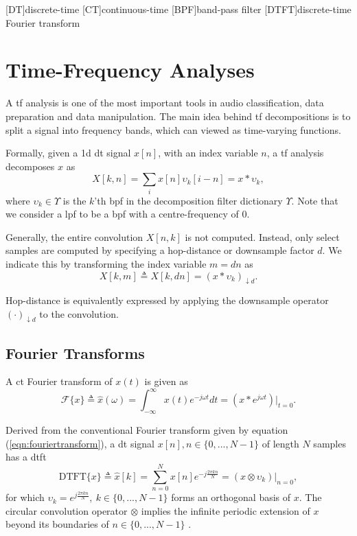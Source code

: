 [DT]{discrete-time}
[CT]{continuous-time}
[BPF]{band-pass filter}
[DTFT]{discrete-time Fourier transform}

\chapter{Time-Frequency Analyses}
\label{chap:p1i}

A \ac{tf} analysis is one of the most important tools in audio classification, data preparation and data manipulation. The main idea behind \ac{tf} decompositions is to split a signal into frequency bands, which can viewed as time-varying functions.

Formally, given a \ac{1d} \ac{dt} signal $x[n]$, with an index variable $n$, a \ac{tf} analysis decomposes $x$ as 
\begin{equation}
    X[k, n] = \sum_i x[n] \upsilon_k[i - n] = x * \upsilon_k,
\end{equation}
where $\upsilon_k \in \Upsilon$ is the $k$'th \ac{bpf} in the decomposition filter dictionary $\Upsilon$. Note that we consider a \ac{lpf} to be a \ac{bpf} with a centre-frequency of 0.

Generally, the entire convolution $X[n,k]$ is not computed. Instead, only select samples are computed by specifying a hop-distance or downsample factor $d$. We indicate this by transforming the index variable $m = dn$ as 
\begin{equation}
    \label{eqn:gentf}
    X[k, m] \triangleq X[k, dn] = \left(x * \upsilon_k\right)_{\downarrow d}.
\end{equation}

Hop-distance is equivalently expressed by applying the downsample operator $\left(\cdot\right)_{\downarrow d}$ to the convolution. 

\section{Fourier Transforms}

A \ac{ct} Fourier transform of $x(t)$ is given as 
\begin{equation}
    \label{eqn:fouriertransform}
    \mathcal{F} \{x\} \triangleq \hat{x}(\omega) = \int_{-\infty}^{\infty} x(t) e^{-j\omega t} dt = \left(x * e^{j\omega t}\right)\bigg|_{t=0}.
\end{equation}


Derived from the conventional Fourier transform given by equation (\ref*{eqn:fouriertransform}), a \ac{dt} signal $x[n], n \in \{0, ..., N-1\}$ of length $N$ samples has a \ac{dtft}
\begin{equation}
    \label{eqn:dtft}
    \text{DTFT}\{x\} \triangleq \hat{x}[k] = \sum_{n=0}^{N} x[n] e^{-j \frac{2\pi k n}{N}} = \left(x \otimes \upsilon_k\right)\bigg|_{n=0},
\end{equation}
for which $\upsilon_k = e^{j \frac{2\pi k n}{N}}, \ k \in \{0, ..., N-1\}$ forms an orthogonal basis of $x$. The circular convolution operator $\otimes$ implies the infinite periodic extension of $x$ beyond its boundaries of $n \in \{0, ..., N-1\}$ \citep{dspbook}. 

